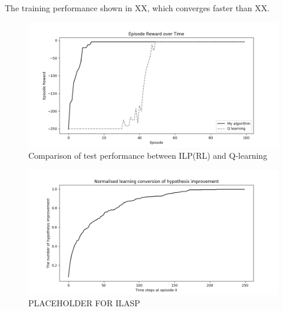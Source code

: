 The training performance shown in XX, which converges faster than XX. 

\begin{figure}[!htb]
\centering
\includegraphics[width=1.0\textwidth]{./figures/experiment3_test}
\caption{Comparison of test performance between ILP(RL) and Q-learning}
\label{experiment3_test}
\end{figure}

\begin{figure}[!htb]
\centering
\includegraphics[width=1.0\textwidth]{./figures/experiment1_ilasp}
\caption{PLACEHOLDER FOR ILASP}
\label{experiment1_test}
\end{figure}

